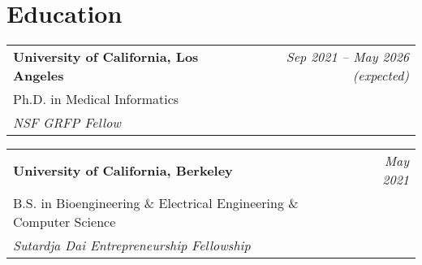 \section*{Education}

\begin{tabularx}{\linewidth}{@{}X r@{}}
	\textbf{University of California, Los Angeles} & \textit{Sep 2021 -- May 2026 (expected)} \\
	Ph.D. in Medical Informatics & \\
    \textit{NSF GRFP Fellow}
\end{tabularx}
\vspace{0.4em}

\begin{tabularx}{\linewidth}{@{}X r@{}}
	\textbf{University of California, Berkeley} & \textit{May 2021} \\
	B.S. in Bioengineering \& Electrical Engineering \& Computer Science & \\
    \textit{Sutardja Dai Entrepreneurship Fellowship}
\end{tabularx}
